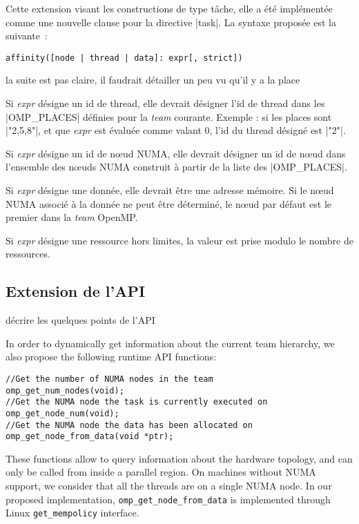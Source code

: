 Cette extension visant les constructions de type tâche, elle a été implémentée
comme une nouvelle clause pour la directive |task|. La syntaxe proposée est la
suivante~:

\begin{lstlisting}
affinity([node | thread | data]: expr[, strict])
\end{lstlisting}

\begin{todo}
    la suite est pas claire, il faudrait détailler un peu vu qu'il y a la place
\end{todo}

Si \emph{expr} désigne un id de thread, elle devrait désigner l'id de thread dans
les |OMP_PLACES| définies pour la \textit{team} courante. Exemple : si les places
sont |"{2},{5},{8}"|, et que \emph{expr} est évaluée comme valant 0, l'id du thread désigné est |"{2}"|.

Si \emph{expr} désigne un id de nœud NUMA, elle devrait désigner un id de nœud
dans l'ensemble des nœuds NUMA construit à partir de la liste des |OMP_PLACES|.

Si \emph{expr} désigne une donnée, elle devrait être une adresse mémoire.
Si le nœud NUMA associé à la donnée ne peut être déterminé, le nœud par défaut
est le premier dans la \textit{team} OpenMP.

Si \emph{expr} désigne une ressource hors limites, la valeur est prise modulo le
nombre de ressources.

\subsection{Extension de l'API}
\begin{todo}
    décrire les quelques points de l'API
\end{todo}

In order to dynamically get information about the current team hierarchy, we also propose
the following runtime API functions:
\begin{lstlisting}
//Get the number of NUMA nodes in the team
omp_get_num_nodes(void);
//Get the NUMA node the task is currently executed on
omp_get_node_num(void);
//Get the NUMA node the data has been allocated on
omp_get_node_from_data(void *ptr);
\end{lstlisting}

These functions allow to query information about the hardware topology, and can only be called from inside a parallel region. On machines without NUMA support, we consider that all the threads are on a single NUMA node.
In our proposed implementation, \verb/omp_get_node_from_data/ is implemented through Linux \verb/get_mempolicy/ interface.

